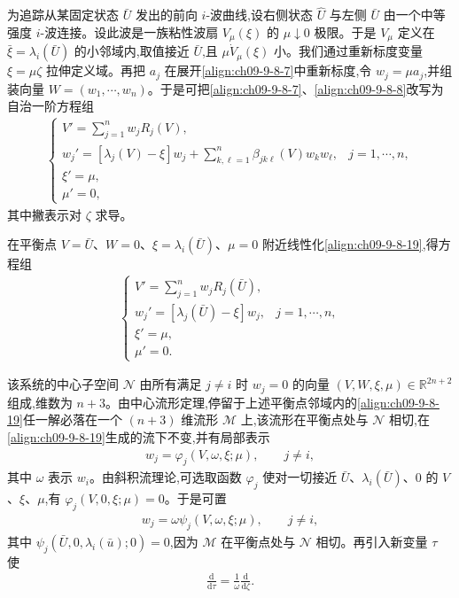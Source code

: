 \documentclass[../../main.tex]{subfiles}
\begin{document}
为追踪从某固定状态 $\bar{U}$ 发出的前向 $i$-波曲线,设右侧状态 $\hat{U}$ 与左侧 $\bar{U}$ 由一个中等强度 $i$-波连接。设此波是一族粘性波扇 $V_{\mu}(\xi)$ 的 $\mu\downarrow0$ 极限。于是 $V_{\mu}$ 定义在 $\bar{\xi}=\lambda_{i}(\bar{U})$ 的小邻域内,取值接近 $\bar{U}$,且 $\mu\dot{V}_{\mu}(\xi)$ 小。我们通过重新标度变量 $\xi=\mu\zeta$ 拉伸定义域。再把 $a_{j}$ 在展开\eqref{align:ch09-9-8-7}中重新标度,令 $w_{j}=\mu a_{j}$,并组装向量 $W=(w_{1},\cdots ,w_{n})$。于是可把\eqref{align:ch09-9-8-7}、\eqref{align:ch09-9-8-8}改写为自治一阶方程组
\begin{align}
\begin{cases}
V'=\displaystyle\sum_{j=1}^{n}w_{j}R_{j}(V),\\[2mm]
w_{j}'=[\lambda_{j}(V)-\xi]w_{j}+\displaystyle\sum_{k,\ell=1}^{n}\beta_{jk\ell}(V)w_{k}w_{\ell},&j=1,\cdots ,n,\\
\xi'=\mu,\\
\mu'=0,
\end{cases}
\label{align:ch09-9-8-19}
\end{align}
其中撇表示对 $\zeta$ 求导。

在平衡点 $V=\bar{U}$、$W=0$、$\xi=\lambda_{i}(\bar{U})$、$\mu=0$ 附近线性化\eqref{align:ch09-9-8-19},得方程组
\begin{align}
\begin{cases}
V'=\displaystyle\sum_{j=1}^{n}w_{j}R_{j}(\bar{U}),\\[2mm]
w_{j}'=[\lambda_{j}(\bar{U})-\xi]w_{j},&j=1,\cdots ,n,\\
\xi'=\mu,\\
\mu'=0.
\end{cases}
\label{align:ch09-9-8-20}
\end{align}

该系统的中心子空间 $\mathscr{N}$ 由所有满足 $j\neq i$ 时 $w_{j}=0$ 的向量 $(V,W,\xi,\mu)\in\mathbb{R}^{2n+2}$ 组成,维数为 $n+3$。由中心流形定理,停留于上述平衡点邻域内的\eqref{align:ch09-9-8-19}任一解必落在一个 $(n+3)$ 维流形 $\mathscr{M}$ 上,该流形在平衡点处与 $\mathscr{N}$ 相切,在\eqref{align:ch09-9-8-19}生成的流下不变,并有局部表示
\begin{align}
w_{j}=\varphi_{j}(V,\omega,\xi;\mu),\qquad j\neq i,
\label{align:ch09-9-8-21}
\end{align}
其中 $\omega$ 表示 $w_{i}$。由斜积流理论,可选取函数 $\varphi_{j}$ 使对一切接近 $\bar{U}$、$\lambda_{i}(\bar{U})$、$0$ 的 $V$、$\xi$、$\mu$,有 $\varphi_{j}(V,0,\xi;\mu)=0$。于是可置
\begin{align}
w_{j}=\omega\psi_{j}(V,\omega,\xi;\mu),\qquad j\neq i,
\label{align:ch09-9-8-22}
\end{align}
其中 $\psi_{j}(\bar{U},0,\lambda_{i}(\bar{u});0)=0$,因为 $\mathscr{M}$ 在平衡点处与 $\mathscr{N}$ 相切。再引入新变量 $\tau$ 使
\begin{align}
\frac{\mathrm{d}}{\mathrm{d}\tau}=\frac{1}{\omega}\frac{\mathrm{d}}{\mathrm{d}\zeta}.
\label{align:ch09-9-8-23}
\end{align}
\end{document}
